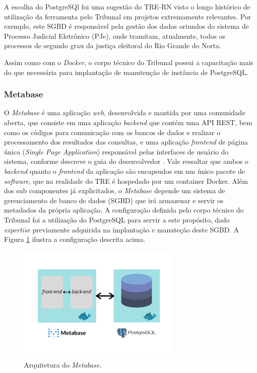 A escolha do PostgreSQl foi uma sugestão do TRE-RN visto o longo histórico de utilização da ferramenta pelo Tribunal em projetos extremamente relevantes. Por exemplo, este SGBD é responsável pela gestão dos dados oriundos do sistema de Processo Judicial Eletrônico (PJe), onde tramitam, atualmente, todos os processos de segundo grau da justiça eleitoral do Rio Grande do Norta.

Assim como com o \textit{Docker}, o corpo técnico do Tribunal possui a capacitação mais do que necessária para implantação de manutenção de instância de PostgreSQL. 

\subsubsection{Metabase}

O \textit{Metabase} é uma aplicação \textit{web}, desenvolvida e mantida por uma comunidade aberta, que consiste em uma aplicação \textit{backend} que contém uma API REST, bem como os códigos para comunicação com os bancos de dados e realizar o processamento dos resultados das consultas, e uma aplicação \textit{frontend} de página única (\textit{Single Page Application}) responsável pelas interfaces de usuário do sistema, conforme descreve o guia do desenvolvedor \cite{metabaseeevguide}. Vale ressaltar que ambos o \textit{backend} quanto o \textit{frontend} da aplicação são encapsudos em um único pacote de \textit{software}, que na realidade do TRE é hospedado por um container Docker.
Além dos sub componentes já explicitados, o \textit{Metabase} depende um sistema de gerenciamento de banco de dados (SGBD) que irá armazenar e servir os metadados da própria aplicação. A configuração definida pelo corpo técnico do Tribunal foi a utilização do PostgreSQL para servir a este propósito, dado \textit{expertise} previamente adquirida na implantação e manuteção deste SGBD. A Figura \ref{fig:arq_metabase} ilustra a configuração descrita acima. 

\begin{figure}[htp]
   \centering
    \includegraphics[width=8cm]{Imagens/Arq_Metabase}
    \caption{Arquitetura do \textit{Metabase}.}
    \label{fig:arq_metabase}
\end{figure} 


